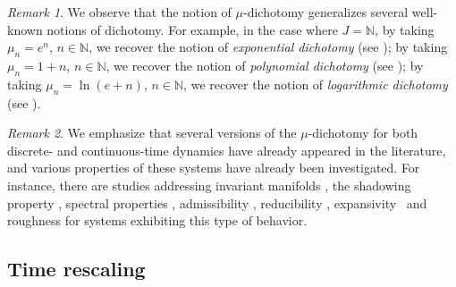 \documentclass[reqno, a4paper, 10pt]{amsart}
\theoremstyle{plain}
\numberwithin{equation}{section}
\theoremstyle{remark}
\newtheorem{remark}{Remark}
\def\N{\mathbb{N}}
\begin{document}
\begin{remark}\label{remark: particular cases of dich}
We observe that the notion of $\mu$-dichotomy generalizes several well-known notions of dichotomy. For example, in the case where $J=\N$, by taking $\mu_n=e^{n}$, $n\in \N$, we recover the notion of \emph{exponential dichotomy} (see \cite{Cop-book}); by taking $\mu_n=1+n$, $n\in \N$, we recover the notion of \emph{polynomial dichotomy} (see \cite{BS1,DSS, D}); by taking $\mu_n= \ln(e+n)$, $n\in \N$, we recover the notion of \emph{logarithmic dichotomy} (see \cite{Silva}).
\end{remark}

\begin{remark}
 We emphasize that several versions of the $\mu$-dichotomy for both discrete- and continuous-time dynamics have already appeared in the literature, and various properties of these systems have already been investigated. For instance, there are studies addressing invariant manifolds \cite{BS-2, BS-1, Pan}, the shadowing property \cite{BD1}, spectral properties \cite{Bac25, JG, Silva2}, admissibility \cite{BD2, Silva}, reducibility \cite{CJ, Silva}, expansivity~\cite{D, EPR} and roughness \cite{NP, CZQ, Chu} for systems exhibiting this type of behavior.
\end{remark}


\subsection{Time rescaling} \label{sec: time rescaling}
\end{document}

